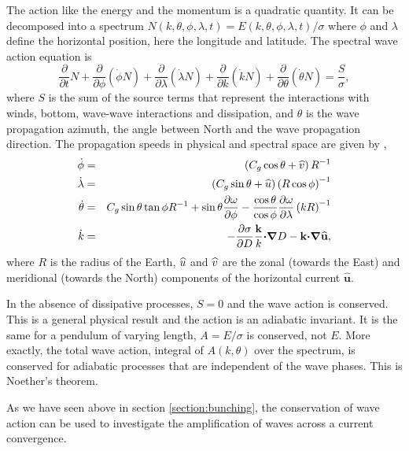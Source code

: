 The action like the energy and the momentum is a quadratic quantity. It can be decomposed into a spectrum $N\left(k,\theta,\phi,\lambda,t\right)=E\left(k,\theta,\phi,\lambda,t\right)/\sigma$ 
where  $\phi$ and $\lambda$ define the horizontal position, here the longitude and latitude. The spectral wave action equation is \citep{WAMBook}
\begin{equation}
    \frac{\partial }{\partial t}N
    +\frac{\partial }{\partial \phi}\left(\dot{\phi} N\right)
    +\frac{\partial }{\partial \lambda}\left(\dot{\lambda} N\right)
    +\frac{\partial }{\partial k}\left(\dot{k} N\right)
    +\frac{\partial }{\partial \theta}\left(\dot{\theta} N\right)
    =\frac{S}{\sigma},\label{Action_balance}
\end{equation}
where $S$ is the sum of the source terms that represent the interactions with winds, bottom, wave-wave interactions and dissipation, and
 $\theta$ is the wave propagation azimuth, the angle between North and the wave propagation direction. The propagation speeds in physical and 
spectral space are given by \cite{Tolman1990b},
\begin{eqnarray}
\dot{\phi} & = & \left(C_g \cos \theta + \widehat{v} \right) R^{-1} \\
\dot{\lambda} & =
    & \left(C_g \sin \theta + \widehat{u} \right) \left(R \cos \phi\right)^{-1} \\
\dot{\theta} & = & C_g \sin \theta \tan \phi R^{-1} 
    +\sin\theta\frac{\partial \omega}{\partial \phi}
    -\frac{\cos \theta}{\cos \phi}\frac{\partial \omega}{\partial \lambda}
    \left(kR\right)^{-1}\\
\dot{k} & = &-\frac{\partial \sigma}{\partial D} \frac{\mathbf{k}}{k} \mbox{\boldmath $\cdot$} \mbox{\boldmath $\nabla$} D - \mathbf{k} \mbox{\boldmath $\cdot$}  \mbox{\boldmath $\nabla$}\widehat{\mathbf{u}},
\end{eqnarray}
where $R$ is the radius of the Earth, $\widehat{u}$ and $\widehat{v}$ are the zonal (towards the East) and meridional (towards the North) components of the horizontal current $\widehat{\mathbf{u}}$.

In the absence of dissipative processes,  $S=0$ and the wave action is conserved. This is a general physical result 
and the action is an adiabatic invariant. It is the same for a pendulum of varying length,  $A=E/\sigma$ is conserved, not $E$. 
More exactly, the total wave action, integral of $A(k,\theta)$ over the spectrum, is conserved
for adiabatic processes that are independent of the wave phases. This is Noether's theorem. %

As we have seen above in section \ref{section:bunching}, the conservation of wave action can be used to investigate the amplification of waves 
across a current convergence.




